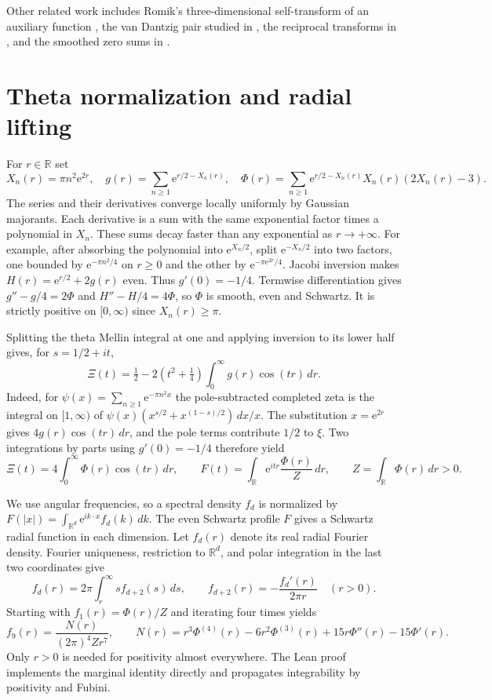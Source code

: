\documentclass[11pt]{article}
\newcommand{\R}{\mathbb R}
\newcommand{\ee}{\mathrm e}
\begin{document}
Other related work includes Romik's three-dimensional self-transform of
an auxiliary function \cite{Romik}, the van Dantzig pair studied in
\cite{KPS}, the reciprocal transforms in \cite{Grochenig}, and the
smoothed zero sums in \cite{SraSmooth}.

\section{Theta normalization and radial lifting}
For $r\in\R$ set
\[
 X_n(r)=\pi n^2\ee^{2r},\quad
 g(r)=\sum_{n\ge1}\ee^{r/2-X_n(r)},\quad
 \Phi(r)=\sum_{n\ge1}\ee^{r/2-X_n(r)}X_n(r)(2X_n(r)-3).
\]
The series and their derivatives converge locally uniformly by Gaussian
majorants. Each derivative is a sum with the same exponential factor
times a polynomial in $X_n$. These sums decay faster than any exponential
as $r\to+\infty$. For example, after absorbing the polynomial into
$\ee^{X_n/2}$, split $\ee^{-X_n/2}$ into two factors, one bounded by
$\ee^{-\pi n^2/4}$ on $r\ge0$ and the other by
$\ee^{-\pi\ee^{2r}/4}$.
Jacobi inversion makes $H(r)=\ee^{r/2}+2g(r)$ even. Thus
$g'(0)=-1/4$. Termwise differentiation gives
$g''-g/4=2\Phi$ and $H''-H/4=4\Phi$, so $\Phi$ is smooth, even and
Schwartz. It is strictly positive on $[0,\infty)$ since $X_n(r)\ge\pi$.

Splitting the theta Mellin integral at one and applying inversion to its
lower half gives, for $s=1/2+it$,
\[
 \Xi(t)=\tfrac12-2(t^2+\tfrac14)\int_0^\infty g(r)\cos(tr)\,dr.
\]
Indeed, for $\psi(x)=\sum_{n\ge1}\ee^{-\pi n^2x}$ the pole-subtracted
completed zeta is the integral on $[1,\infty)$ of
$\psi(x)(x^{s/2}+x^{(1-s)/2})\,dx/x$. The substitution $x=\ee^{2r}$
gives $4g(r)\cos(tr)\,dr$, and the pole terms contribute $1/2$ to $\xi$.
Two integrations by parts using $g'(0)=-1/4$ therefore yield
\[
 \Xi(t)=4\int_0^\infty \Phi(r)\cos(tr)\,dr,
 \qquad
 F(t)=\int_{\R}\ee^{itr}\frac{\Phi(r)}{Z}\,dr,
 \qquad Z=\int_{\R}\Phi(r)\,dr>0.
\]

We use angular frequencies, so a spectral density $f_d$ is normalized
by $F(|x|)=\int_{\R^d}\ee^{ik\cdot x}f_d(k)\,dk$.
The even Schwartz profile $F$ gives a Schwartz radial function in each
dimension. Let $f_d(r)$ denote its real radial Fourier density. Fourier
uniqueness, restriction to $\R^d$, and polar integration in the last two
coordinates give
\[
 f_d(r)=2\pi\int_r^\infty s f_{d+2}(s)\,ds,
 \qquad f_{d+2}(r)=-\frac{f_d'(r)}{2\pi r}\quad(r>0).
\]
Starting with $f_1(r)=\Phi(r)/Z$ and iterating four times yields
\begin{equation}\label{eq:d9}
 f_9(r)=\frac{N(r)}{(2\pi)^4Zr^7},\qquad
 N(r)=r^3\Phi^{(4)}(r)-6r^2\Phi^{(3)}(r)+15r\Phi''(r)-15\Phi'(r).
\end{equation}
Only $r>0$ is needed for positivity almost everywhere. The Lean proof
implements the marginal identity directly and propagates integrability
by positivity and Fubini.
\end{document}
